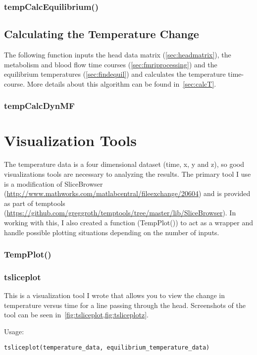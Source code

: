 \subsection{tempCalcEquilibrium()}

\clearpage
\section{Calculating the Temperature Change}
The following function inputs the head data matrix (\cref{sec:headmatrix}), the metabolism and blood flow time courses (\cref{sec:fmriprocessing}) and the equilibrium temperatures (\cref{sec:findequil}) and calculates the temperature time-course.   More details about this algorithm can be found in~\cref{sec:calcT}.
\subsection{tempCalcDynMF}

\chapter{Visualization Tools}
\label{ch:visualize}
The temperature data is a four dimensional dataset (time, x, y and z), so good visualizations tools are necessary to analyzing the results.  The primary tool I use is a modification of SliceBrowser (\url{http://www.mathworks.com/matlabcentral/fileexchange/20604}) and is provided as part of temptools (\url{https://github.com/greggroth/temptools/tree/master/lib/SliceBrowser}).  In working with this, I also created a function (TempPlot()) to act as a wrapper and handle possible plotting situations depending on the number of inputs.
\subsection{TempPlot()}

\subsection{tsliceplot}
This is a visualization tool I wrote that allows you to view the change in temperature versus time for a line passing through the head.  Screenshots of the tool can be seen in~\cref{fig:tsliceplot,fig:tsliceplotz}.

Usage:
\begin{lstlisting}[style=snippet,label=invoke-tsliceplot]
  tsliceplot(temperature_data, equilibrium_temperature_data)
\end{lstlisting}

